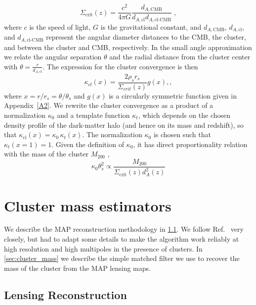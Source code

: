 \documentclass[prd, superscriptaddress, tightenlines, longbibliography, nofootinbib, eqsecnum, amsfonts, amsmath, floatfix, twocolumn, notitlepage]{revtex4-2}
\begin{document}
\begin{equation}
\Sigma_{\text{crit}}(z) = \frac{c^2}{4\pi G}\frac{d_{A,\text{CMB}}}{d_{A,\text{cl}}d_{A,\text{cl-CMB}}} \; ,
\end{equation}
where $c$ is the speed of light, $G$ is the gravitational constant, and $d_{A,\text{CMB}}$, $d_{A,\text{cl}}$, and $d_{A,\text{cl-CMB}}$ represent the angular diameter distances to the CMB, the cluster, and between the cluster and CMB, respectively. 
In the small angle approximation we relate the angular separation $\theta$ and the radial distance from the cluster center with $\theta = \frac{r}{d_{A,\text{cl}}}$.
The expression for the cluster convergence is then~\cite{Takada:2002qq}
\begin{equation}
    \kappa_{cl} (x) = \frac{2\rho_s r_s}{\Sigma_{crit}(z)}g(x), ,
\end{equation}
where  $x= r / r_s = \theta / \theta_s$ and $g(x)$ is a circularly symmetric function given in Appendix~\ref{A2}. 
We rewrite the cluster convergence as a product of a normalization $\kappa_0$ and a template function $\kappa_t$, which depends on the chosen density profile of the dark-matter halo (and hence on its mass and redshift), so that $\kappa_{\text{cl}} (x) = \kappa_0 \, \kappa_t (x)$.
The normalization $\kappa_0$ is chosen such that $\kappa_t(x=1) = 1$.
Given the definition of $\kappa_0$, it has direct proportionality relation with the mass of the cluster $M_{200}$ \cite{Zubeldia:2019brr},
\begin{equation}\label{eq:tracer}
    \kappa_0 \theta_s^2 \propto \frac{M_{200}}{\Sigma_{\text{crit}}(z)d_{A}^2(z)}
\end{equation}


 

\section{Cluster mass estimators}
\label{sec:method}
We describe the MAP reconstruction methodology in \ref{sec:estimators}. We follow  Ref.~\cite{Carron:2017mqf} very closely, but had to adapt some details to make the algorithm work reliably at high resolution and high multipoles in the presence of clusters.
In \ref{sec:cluster_mass} we describe the simple matched filter we use to recover the mass of the cluster from the MAP lensing maps.

\subsection{Lensing Reconstruction}
\label{sec:estimators}
\end{document}
